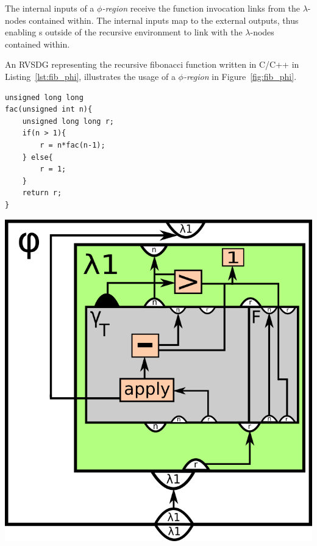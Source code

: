 \begin{itemize}
The internal inputs of a \textit{$\phi$-region} receive the function invocation links from the
$\lambda$-nodes contained within. The internal inputs map to the external
outputs, thus enabling \applyNode s outside of the recursive environment to link
with the $\lambda$-nodes contained within.

An RVSDG representing the recursive fibonacci function written in C/C++ in
Listing~\ref{lst:fib_phi}, illustrates the usage of a \textit{$\phi$-region} in
Figure~\ref{fig:fib_phi}.

\begin{centering}
	\noindent\begin{minipage}{0.37\textwidth}
		\begin{CenteredBox}
		\begin{lstlisting}[label={lst:recursive_factorial_func_ex},
style=minipage_customcpp]
unsigned long long
fac(unsigned int n){
	unsigned long long r;
	if(n > 1){
		r = n*fac(n-1);
	} else{
		r = 1;
	}
	return r;
}
		\end{lstlisting}
		\end{CenteredBox}
	\end{minipage}
	\noindent\begin{minipage}{0.55\textwidth}
		\captionsetup{type=figure}
		\includegraphics[width=\textwidth]{figures/recursive_factorial_func_ex}
	\end{minipage}
	\label{fig:recursive_factorial_func_ex}
\end{centering}

\end{itemize}
